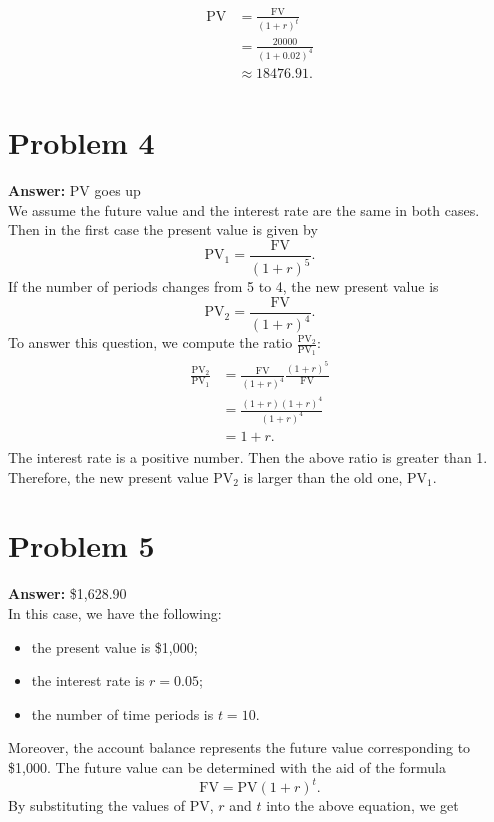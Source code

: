 \documentclass[11pt]{article}
\newcommand{\pv}{\mathrm{PV}}
\newcommand{\fv}{\mathrm{FV}}
\begin{document}
\begin{align}
  \begin{split}
    \pv&=\frac{\fv}{(1+r)^t}\\
    &=\frac{20000}{(1+0.02)^4}\\
    &\approx 18476.91.
  \end{split}
\end{align}
\section*{Problem 4}
\label{sec:orgf695a08}

\textbf{Answer:} \(\pv\) goes up\\

We assume the future value and the interest rate are the same in both cases.
Then in the first case the present value is given by
\begin{equation}
\pv_1=\frac{\fv}{(1+r)^5}.
\end{equation}
If the number of periods changes from 5 to 4, the new present value is
\begin{equation}
\pv_2=\frac{\fv}{(1+r)^4}.
\end{equation}
To answer this question, we compute the ratio \(\frac{\pv_2}{\pv_1}\):
\begin{align}
  \begin{split}
    \frac{\pv_2}{\pv_1}&=\frac{\fv}{(1+r)^4}\frac{(1+r)^5}{\fv}\\
    &=\frac{(1+r)(1+r)^4}{(1+r)^4}\\
    &=1+r.
  \end{split}
\end{align}
The interest rate is a positive number. Then the above ratio is greater than 1.
Therefore, the new present value \(\pv_2\) is larger than the old one,
\(\pv_1\).
\section*{Problem 5}
\label{sec:org5525fa5}

\textbf{Answer:} \$1,628.90\\

In this case, we have the following:
\begin{itemize}
\item the present value is \$1,000;
\item the interest rate is \(r=0.05\);
\item the number of time periods is \(t=10\).
\end{itemize}
Moreover, the account balance represents the future value corresponding to
\$1,000. The future value can be determined with the aid of the formula
\begin{equation}
\fv=\pv(1+r)^t.
\end{equation}
By substituting the values of \(\pv\), \(r\) and \(t\) into the above
equation, we get
\end{document}
